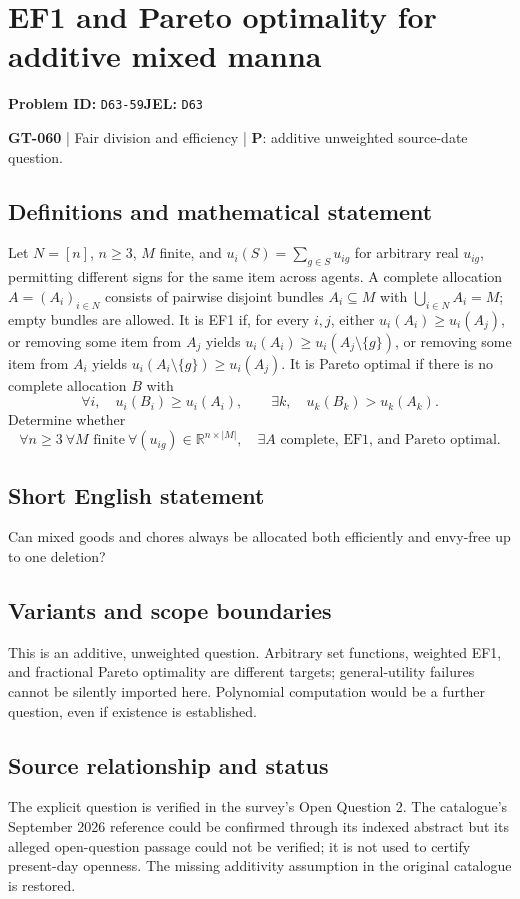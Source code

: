 \documentclass[11pt,a4paper]{article}
\begin{document}
\section*{EF1 and Pareto optimality for additive mixed manna}
\textbf{Problem ID:} \texttt{D63-59}\quad \textbf{JEL:} \texttt{D63}\par
\label{problem:OP-0190}
\label{game:GT-060}
{\sffamily\small\color{muted}
\textbf{GT-060} | Fair division and efficiency | \textbf{P}: additive unweighted source-date question.
\par}
\subsection*{Definitions and mathematical statement}
Let $N=[n]$, $n\geq3$, $M$ finite, and $u_i(S)=\sum_{g\in S}u_{ig}$ for arbitrary real $u_{ig}$, permitting different signs for the same item across agents. A complete allocation $A=(A_i)_{i\in N}$ consists of pairwise disjoint bundles $A_i\subseteq M$ with $\bigcup_{i\in N}A_i=M$; empty bundles are allowed. It is EF1 if, for every $i,j$, either $u_i(A_i)\geq u_i(A_j)$, or removing some item from $A_j$ yields $u_i(A_i)\geq u_i(A_j\setminus\{g\})$, or removing some item from $A_i$ yields $u_i(A_i\setminus\{g\})\geq u_i(A_j)$. It is Pareto optimal if there is no complete allocation $B$ with
\[
 \forall i,\quad u_i(B_i)\geq u_i(A_i),
 \qquad \exists k,\quad u_k(B_k)>u_k(A_k).
\]
Determine whether
\[
 \forall n\geq3\ \forall M\text{ finite}\ \forall(u_{ig})\in\mathbb R^{n\times|M|},
 \quad\exists A\text{ complete, EF1, and Pareto optimal}.
\]
\subsection*{Short English statement}
Can mixed goods and chores always be allocated both efficiently and envy-free up to one deletion?
\subsection*{Variants and scope boundaries}
This is an additive, unweighted question. Arbitrary set functions, weighted EF1, and fractional Pareto optimality are different targets; general-utility failures cannot be silently imported here. Polynomial computation would be a further question, even if existence is established.
\subsection*{Source relationship and status}
The explicit question is verified in the survey's Open Question 2. The catalogue's September 2026 reference could be confirmed through its indexed abstract but its alleged open-question passage could not be verified; it is not used to certify present-day openness. The missing additivity assumption in the original catalogue is restored.
\end{document}
